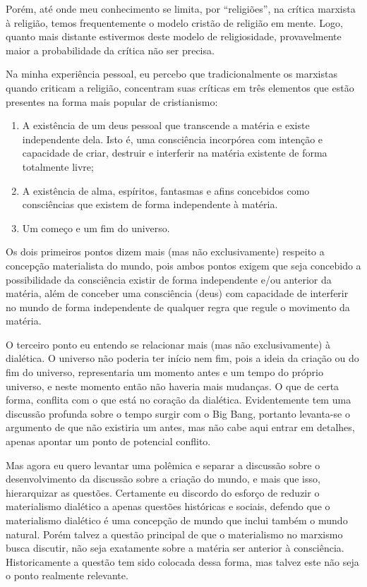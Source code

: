 Porém, até onde meu conhecimento se limita, por “religiões”, na crítica marxista à religião, temos frequentemente o modelo cristão de religião em mente. Logo, quanto mais distante estivermos deste modelo de religiosidade, provavelmente maior a probabilidade da crítica não ser precisa.

Na minha experiência pessoal, eu percebo que tradicionalmente os marxistas quando criticam a religião, concentram suas críticas em três elementos que estão presentes na forma mais popular de cristianismo:

\begin{enumerate}
    \item A existência de um deus pessoal que transcende a matéria e existe independente dela. Isto é, uma consciência incorpórea com intenção e capacidade de criar, destruir e interferir na matéria existente de forma totalmente livre;
    \item A existência de alma, espíritos, fantasmas e afins concebidos como consciências que existem de forma independente à matéria.
    \item Um começo e um fim do universo. 
\end{enumerate}
Os dois primeiros pontos dizem mais (mas não exclusivamente) respeito a concepção materialista do mundo, pois ambos pontos exigem que seja concebido a possibilidade da consciência existir de forma independente e/ou anterior da matéria, além de conceber uma consciência (deus) com capacidade de interferir no mundo de forma independente de qualquer regra que regule o movimento da matéria. 

O terceiro ponto eu entendo se relacionar mais (mas não exclusivamente) à dialética. O universo não poderia ter início nem fim, pois a ideia da criação ou do fim do universo, representaria um momento antes e um tempo do próprio universo, e neste momento então não haveria mais mudanças. O que de certa forma, conflita com o que está no coração da dialética. Evidentemente tem uma discussão profunda sobre o tempo surgir com o Big Bang, portanto levanta-se o argumento de que não existiria um antes, mas não cabe aqui entrar em detalhes, apenas apontar um ponto de potencial conflito.

Mas agora eu quero levantar uma polêmica e separar a discussão sobre o desenvolvimento da discussão sobre a criação do mundo, e mais que isso, hierarquizar as questões. Certamente eu discordo do esforço de reduzir o materialismo dialético a apenas questões históricas e sociais, defendo que o materialismo dialético é uma concepção de mundo que inclui também o mundo natural. Porém talvez a questão principal de que o materialismo no marxismo busca discutir, não seja exatamente sobre a matéria ser anterior à consciência. Historicamente a questão tem sido colocada dessa forma, mas talvez este não seja o ponto realmente relevante. 

